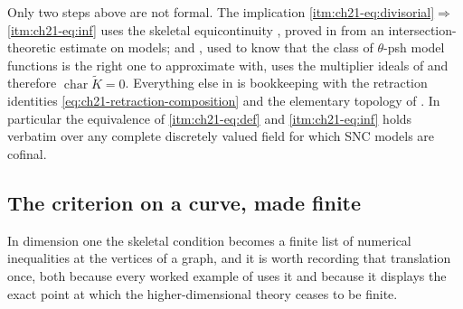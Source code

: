 \begin{remark}
\label{rem:ch21-which-deep}
Only two steps above are not formal.  The implication
\cref{itm:ch21-eq:divisorial}\(\Rightarrow\)\cref{itm:ch21-eq:inf} uses the
skeletal equicontinuity , proved in
 from an intersection-theoretic estimate on
models; and , used to know that the class
of \(\theta\)-psh model functions is the right one to approximate with, uses
the multiplier ideals of  and therefore
\(\operatorname{char}\widetilde K=0\).  Everything else in
 is bookkeeping with the retraction identities
\eqref{eq:ch21-retraction-composition} and the elementary topology of
.  In particular the equivalence of
\cref{itm:ch21-eq:def} and \cref{itm:ch21-eq:inf} holds verbatim over any
complete discretely valued field for which SNC models are cofinal.
\end{remark}

\subsection{The criterion on a curve, made finite}
\label{sec:ch21-equivalent-curve}

In dimension one the skeletal condition becomes a finite list of numerical
inequalities at the vertices of a graph, and it is worth recording that
translation once, both because every worked example of
 uses it and because it displays the exact point at
which the higher-dimensional theory ceases to be finite.

